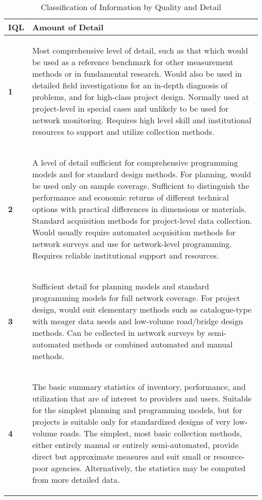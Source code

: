 \documentclass{standalone}
\begin{document}
\begin{table}[ht]\label{table:iql_detail}
\centering
    \begin{tabular}{ | l | p{15cm} |}

    \hline
    \textbf{IQL} & \hspace{5cm}
   \textbf{ Amount of Detail} \\ \hline


    \textbf{1} & \begin{footnotesize}
    Most comprehensive level of detail, such as that which would be used as a
reference benchmark for other measurement methods or in fundamental
research. Would also be used in detailed field investigations for an in-depth
diagnosis of problems, and for high-class project design. Normally used at
project-level in special cases and unlikely to be used for network monitoring.
Requires high level skill and institutional resources to support and utilize
collection methods.
    \end{footnotesize}\\
	\textbf{2} & \begin{footnotesize}
	A level of detail sufficient for comprehensive programming models and for
standard design methods. For planning, would be used only on sample coverage.
Sufficient to distinguish the performance and economic returns of different
technical options with practical differences in dimensions or materials. Standard
acquisition methods for project-level data collection. Would usually require
automated acquisition methods for network surveys and use for network-level
programming. Requires reliable institutional support and resources.
	\end{footnotesize} \\
	\textbf{3} &\begin{footnotesize}
	 Sufficient detail for planning models and standard programming models for full
network coverage. For project design, would suit elementary methods such as
catalogue-type with meager data needs and low-volume road/bridge design
methods. Can be collected in network surveys by semi-automated methods or
combined automated and manual methods.
	\end{footnotesize}\\
	\textbf{4} & \begin{footnotesize}
	The basic summary statistics of inventory, performance, and utilization that are
of interest to providers and users. Suitable for the simplest planning and
programming models, but for projects is suitable only for standardized designs of
very low-volume roads. The simplest, most basic collection methods, either
entirely manual or entirely semi-automated, provide direct but approximate
measures and suit small or resource-poor agencies. Alternatively, the statistics
may be computed from more detailed data.
	\end{footnotesize} \\


\hline
    \end{tabular}
 \caption{Classification of Information by Quality and Detail}
\end{table}
\clearpage
\end{document}
